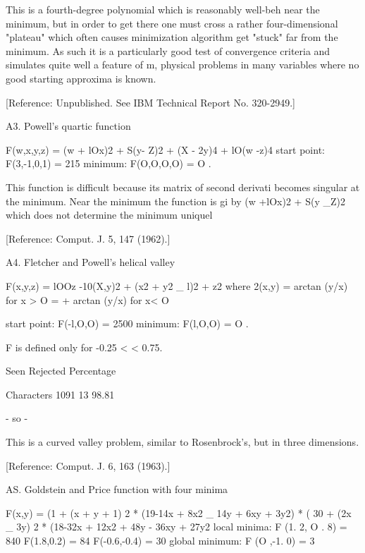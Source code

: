      This is a fourth-degree polynomial which is reasonably well-beh
near the minimum, but in order to get there one must cross a rather
four-dimensional "plateau" which often causes minimization algorithm
get "stuck" far from the minimum.  As such it is a particularly good
test of convergence criteria and simulates quite well a feature of m,
physical problems in many variables where no good starting approxima
is known.
 
[Reference:  Unpublished.  See IBM Technical Report No. 320-2949.]
 
 
 
A3.  Powell's quartic function
 
 
     F(w,x,y,z) = (w + lOx)2 + S(y- Z)2 + (X - 2y)4 + lO(w -z)4
start point:               F(3,-1,0,1) = 215
minimum:                   F(O,O,O,O)  = O .
 
     This function is difficult because its matrix of second derivati
becomes singular at the minimum.  Near the minimum the function is gi
by (w +lOx)2 + S(y _Z)2 which does not determine the minimum uniquel
 
[Reference:  Comput. J. 5, 147 (1962).]
 
 
 
A4.  Fletcher and Powell's helical valley
 
 
          F(x,y,z) = lOOz -10(X,y)2 + (x2 + y2 _ l)2 + z2
where               2(x,y) = arctan (y/x) for x > O
                       =  + arctan (y/x) for x< O
 
start point:               F(-l,O,O) = 2500
minimum:                     F(l,O,O) = O .
 
F is defined only for -0.25 <  < 0.75.
 
                 Seen Rejected  Percentage
 
Characters       1091       13   98.81
 
                                - so -
 
 
     This is a curved valley problem, similar to Rosenbrock's, but in
three dimensions.
 
[Reference:  Comput. J. 6, 163 (1963).]
 
 
 
AS. Goldstein and Price function with four minima
 
 
     F(x,y) = (1 + (x + y + 1) 2 * (19-14x + 8x2 _ 14y + 6xy + 3y2)
             * ( 30 + (2x _ 3y) 2 * (18-32x + 12x2 + 48y - 36xy + 27y2
local minima:          F (1. 2, O . 8) = 840
                       F(1.8,0.2)   = 84
                       F(-0.6,-0.4) = 30
global minimum:        F (O ,-1. 0) = 3
 

